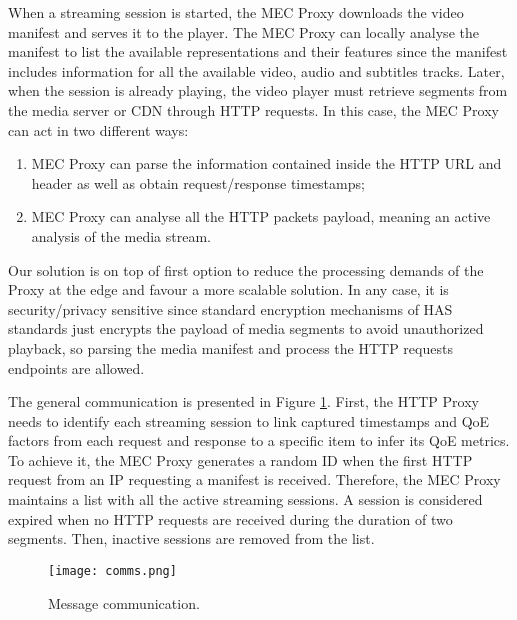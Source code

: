 When a streaming session is started, the MEC Proxy downloads the video manifest and serves it to the player. The MEC Proxy can locally analyse the manifest to list the available representations and their features since the manifest includes information for all the available video, audio and subtitles tracks. Later, when the session is already playing, the video player must retrieve segments from the media server or CDN through HTTP requests. In this case, the MEC Proxy can act in two different ways:
\begin{enumerate}
	\item MEC Proxy can parse the information contained inside the HTTP URL and header as well as obtain request/response timestamps;
	\item MEC Proxy can analyse all the HTTP packets payload, meaning an active analysis of the media stream.
\end{enumerate}

Our solution is on top of first option to reduce the processing demands of the Proxy at the edge and favour a more scalable solution. In any case, it is security/privacy sensitive since standard encryption mechanisms of HAS standards just encrypts the payload of media segments to avoid unauthorized playback, so parsing the media manifest and process the HTTP requests endpoints are allowed.

The general communication is presented in Figure \ref{fig:MTAP2020communication}. First, the HTTP Proxy needs to identify each streaming session to link captured timestamps and QoE factors from each request and response to a specific item to infer its QoE metrics. To achieve it, the MEC Proxy generates a random ID when the first HTTP request from an IP requesting a manifest is received. Therefore, the MEC Proxy maintains a list with all the active streaming sessions. A session is considered expired when no HTTP requests are received during the duration of two segments. Then, inactive sessions are removed from the list.

\begin{figure}[htp]
	\centering
	\texttt{[image: comms.png]}
	\caption{Message communication.}
	\label{fig:MTAP2020communication} %
\end{figure}


